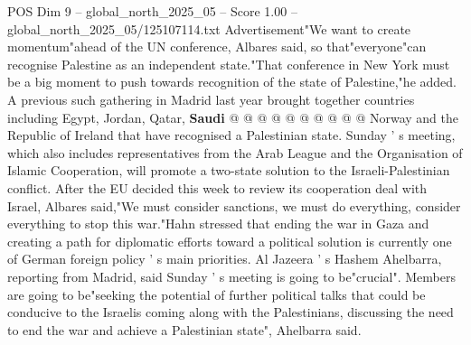 \begin{textsample}{POS Dim 9 – global\_north\_2025\_05 – Score 1.00 – global\_north\_2025\_05/125107114.txt}
Advertisement"We want to create momentum"ahead of the UN conference, Albares said, so that"everyone"can recognise Palestine as an independent state."That conference in New York must be a big moment to push towards recognition of the state of Palestine,"he added.
A previous such gathering in Madrid last year brought together countries including Egypt, Jordan, Qatar, \textbf{Saudi} @ @ @ @ @ @ @ @ @ @ Norway and the Republic of Ireland that have recognised a Palestinian state.
Sunday ' s meeting, which also includes representatives from the Arab League and the Organisation of Islamic Cooperation, will promote a two-state solution to the Israeli-Palestinian conflict.
After the EU decided this week to review its cooperation deal with Israel, Albares said,"We must consider sanctions, we must do everything, consider everything to stop this war."Hahn stressed that ending the war in Gaza and creating a path for diplomatic efforts toward a political solution is currently one of German foreign policy ' s main priorities.
Al Jazeera ' s Hashem Ahelbarra, reporting from Madrid, said Sunday ' s meeting is going to be"crucial".
Members are going to be"seeking the potential of further political talks that could be conducive to the Israelis coming along with the Palestinians, discussing the need to end the war and achieve a Palestinian state", Ahelbarra said.

\end{textsample}
